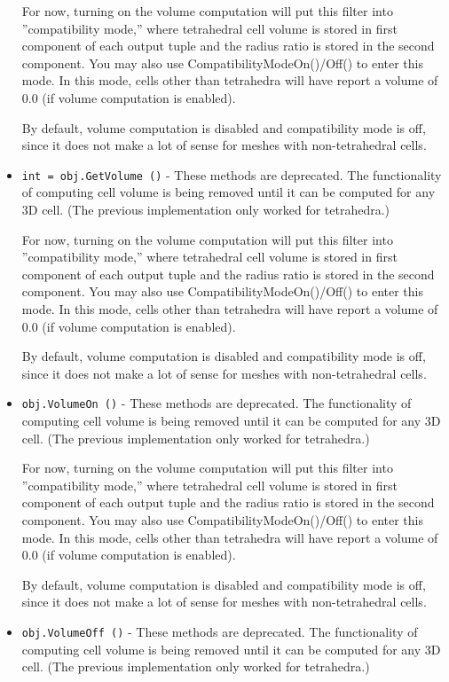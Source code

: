 \begin{itemize}
 For now, turning on the volume computation will put this
 filter into ''compatibility mode,'' where tetrahedral cell
 volume is stored in first component of each output tuple and
 the radius ratio is stored in the second component. You may
 also use CompatibilityModeOn()/Off() to enter this mode.
 In this mode, cells other than tetrahedra will have report
 a volume of 0.0 (if volume computation is enabled).

 By default, volume computation is disabled and compatibility
 mode is off, since it does not make a lot of sense for
 meshes with non-tetrahedral cells.

\item  \verb|int = obj.GetVolume ()| -  These methods are deprecated. The functionality of computing cell
 volume is being removed until it can be computed for any 3D cell.
 (The previous implementation only worked for tetrahedra.)

 For now, turning on the volume computation will put this
 filter into ''compatibility mode,'' where tetrahedral cell
 volume is stored in first component of each output tuple and
 the radius ratio is stored in the second component. You may
 also use CompatibilityModeOn()/Off() to enter this mode.
 In this mode, cells other than tetrahedra will have report
 a volume of 0.0 (if volume computation is enabled).

 By default, volume computation is disabled and compatibility
 mode is off, since it does not make a lot of sense for
 meshes with non-tetrahedral cells.

\item  \verb|obj.VolumeOn ()| -  These methods are deprecated. The functionality of computing cell
 volume is being removed until it can be computed for any 3D cell.
 (The previous implementation only worked for tetrahedra.)

 For now, turning on the volume computation will put this
 filter into ''compatibility mode,'' where tetrahedral cell
 volume is stored in first component of each output tuple and
 the radius ratio is stored in the second component. You may
 also use CompatibilityModeOn()/Off() to enter this mode.
 In this mode, cells other than tetrahedra will have report
 a volume of 0.0 (if volume computation is enabled).

 By default, volume computation is disabled and compatibility
 mode is off, since it does not make a lot of sense for
 meshes with non-tetrahedral cells.

\item  \verb|obj.VolumeOff ()| -  These methods are deprecated. The functionality of computing cell
 volume is being removed until it can be computed for any 3D cell.
 (The previous implementation only worked for tetrahedra.)


\end{itemize}
